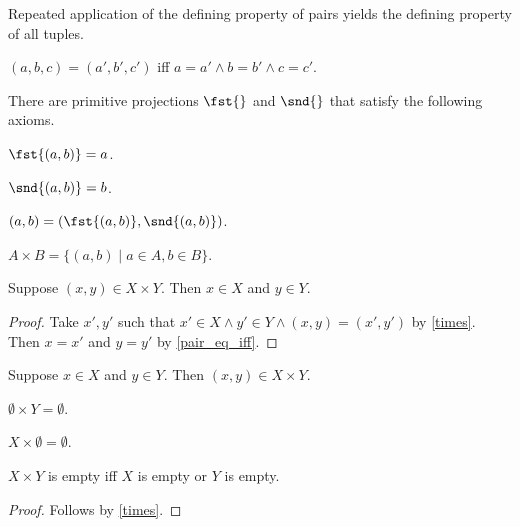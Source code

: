 Repeated application of the defining property of pairs yields the defining property of
all tuples.

\begin{proposition}\label{triple_eq_iff}
    $(a, b, c) = (a', b', c')$ iff $a = a' \land b = b'\land c = c'$.
\end{proposition}

There are primitive projections $\fst{}$ and $\snd{}$ that satisfy the following axioms.

\begin{axiom}\label{fst_eq}
    $\fst{(a, b)} = a$.
\end{axiom}

\begin{axiom}\label{snd_eq}
    $\snd{(a, b)} = b$.
\end{axiom}

\begin{proposition}\label{pair_eq_pair_of_proj}
    $(a, b) = (\fst{(a,b)},\snd{(a,b)})$.
\end{proposition}


\begin{definition}\label{times}
    $A\times B = \{ (a,b) \mid a\in A, b\in B \}$.
\end{definition}

\begin{proposition}\label{times_tuple_elim}
    Suppose $(x, y)\in X\times Y$. Then $x\in X$ and $y\in Y$.
\end{proposition}
\begin{proof}
    Take $x', y'$ such that $x'\in X\land y'\in Y \land (x, y) = (x', y')$
        by \cref{times}.
    Then $x = x'$ and $y = y'$ by \cref{pair_eq_iff}.
\end{proof}

\begin{proposition}\label{times_tuple_intro}
    Suppose $x\in X$ and $y\in Y$. Then $(x, y)\in X\times Y$.
\end{proposition}

\begin{proposition}\label{times_empty_left}
    $\emptyset\times Y = \emptyset$.
\end{proposition}

\begin{proposition}\label{times_empty_right}
    $X\times \emptyset = \emptyset$.
\end{proposition}

\begin{proposition}\label{times_empty_iff}
    $X\times Y$ is empty iff $X$ is empty or $Y$ is empty.
\end{proposition}
\begin{proof}
    Follows by \cref{times}.
\end{proof}

